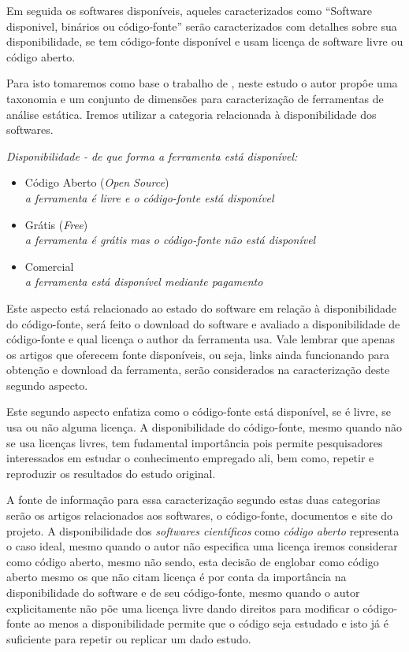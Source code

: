 Em seguida os softwares disponíveis, aqueles caracterizados como ``Software
disponivel, binários ou código-fonte'' serão caracterizados com detalhes sobre
sua disponibilidade, se tem código-fonte disponível e usam licença de software
livre ou código aberto.

Para isto tomaremos como base o trabalho de , neste
estudo o autor propôe uma taxonomia e um conjunto de dimensões para
caracterização de ferramentas de análise estática. Iremos utilizar a categoria
relacionada à disponibilidade dos softwares.

\begin{description}

  \item {\it Disponibilidade - de que forma a ferramenta está disponível:}
    \begin{itemize}
      \item Código Aberto ({\it Open Source})\\
        {\it \small a ferramenta é livre e o código-fonte está disponível}
      \item Grátis ({\it Free})\\
        {\it \small a ferramenta é grátis mas o código-fonte não está disponível}
      \item Comercial\\
        {\it \small a ferramenta está disponível mediante pagamento}
    \end{itemize}

\end{description}

Este aspecto está relacionado ao estado do software em relação à
disponibilidade do código-fonte, será feito o download do software e avaliado
a disponibilidade de código-fonte e qual licença o author da ferramenta
usa. Vale lembrar que apenas os artigos que oferecem fonte disponíveis, ou seja,
links ainda funcionando para obtenção e download da ferramenta, serão considerados
na caracterização deste segundo aspecto.

Este segundo aspecto enfatiza como o código-fonte está disponível, se é livre,
se usa ou não alguma licença. A disponibilidade do código-fonte, mesmo quando
não se usa licenças livres, tem fudamental importância pois permite
pesquisadores interessados em estudar o conhecimento empregado ali, bem como,
repetir e reproduzir os resultados do estudo original.

A fonte de informação para essa caracterização segundo estas duas categorias
serão os artigos relacionados aos softwares, o código-fonte, documentos e site
do projeto. A disponibilidade dos {\it softwares científicos} como {\it código
aberto} representa o caso ideal, mesmo quando o autor não especifica uma
licença iremos considerar como código aberto, mesmo não sendo, esta decisão de
englobar como código aberto mesmo os que não citam licença é por conta da
importância na disponibilidade do software e de seu código-fonte, mesmo quando
o autor explicitamente não põe uma licença livre dando direitos para modificar
o código-fonte ao menos a disponibilidade permite que o código seja estudado e
isto já é suficiente para repetir ou replicar um dado estudo.

